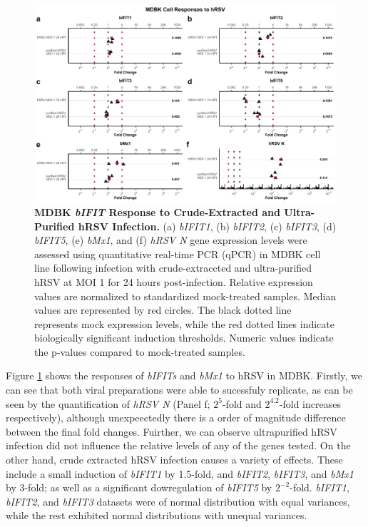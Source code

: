 \begin{figure}
    \centering
    \includegraphics[width=1\linewidth]{07. Chapter 2/Figs/02. Induction/07. mdbk_hrsv.pdf}
    \caption[MDBK \textit{bIFIT} Response to Crude-Extracted and Ultra-Purified hRSV Infection.]{\textbf{MDBK \textit{bIFIT} Response to Crude-Extracted and Ultra-Purified hRSV Infection.} (a) \textit{bIFIT1}, (b) \textit{bIFIT2}, (c) \textit{bIFIT3}, (d) \textit{bIFIT5}, (e) \textit{bMx1}, and (f) \textit{hRSV N} gene expression levels were assessed using quantitative real-time PCR (qPCR) in MDBK cell line following infection with crude-extraccted and ultra-purified hRSV at MOI 1 for 24 hours post-infection. Relative expression values are normalized to standardized mock-treated samples. Median values are represented by red circles. The black dotted line represents mock expression levels, while the red dotted lines indicate biologically significant induction thresholds. Numeric values indicate the p-values compared to mock-treated samples.}
    \label{fig:bIFIT responses to hRSV infection in MDBK}
\end{figure}

Figure \ref{fig:bIFIT responses to hRSV infection in MDBK} shows the responses of \textit{bIFITs} and \textit{bMx1} to hRSV in MDBK. Firstly, we can see that both viral preparations were able to sucessfuly replicate, as can be seen by the quantification of \textit{hRSV N} (Panel f; \(2^{5}\)-fold and \(2^{4.2}\)-fold increases respectively), although unexpeectedly there is a order of magnitude difference between the final fold changes. Fuirther, we can observe ultrapurified hRSV infection did not influence the relative levels of any of the genes tested. On the other hand, crude extracted hRSV infection causes a variety of effects. These include a small induction of \textit{bIFIT1} by 1.5-fold, and \textit{bIFIT2}, \textit{bIFIT3}, and \textit{bMx1} by 3-fold; as well as a significant dowregulation of \textit{bIFIT5} by \(2^{-2}\)-fold. \textit{bIFIT1}, \textit{bIFIT2}, and \textit{bIFIT3} datasets were of normal distribution with equal variances, while the rest exhibited normal distributions with unequal variances.

